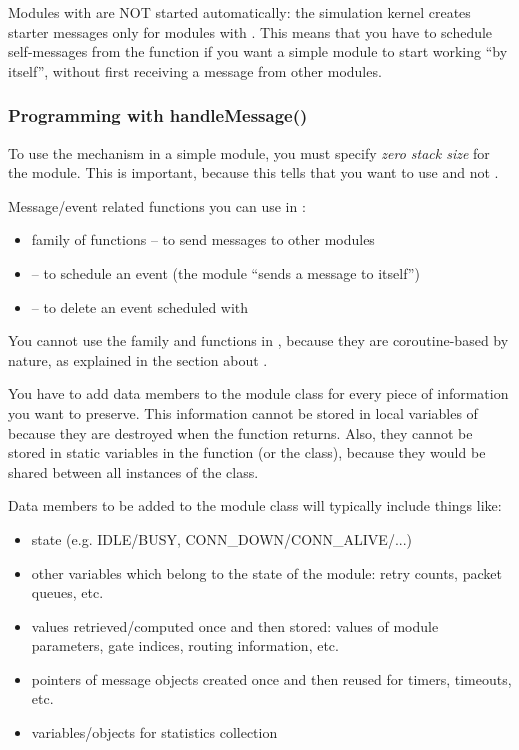 Modules with  are NOT started automatically:
the simulation kernel creates starter messages
only for modules with . This means that you have to
schedule self-messages from the
 function if you want a 
simple module to start working ``by itself'', without first receiving
a message from other modules.


\subsubsection{Programming with handleMessage()}


To use the  mechanism in a
simple module, you must specify \textit{zero
  stack size} for the module. This is
important, because this tells {\opp} that you want to use
 and not .

Message/event related functions you can use in :

\begin{itemize}
  \item{ family of functions -- to send messages to other modules}
  \item{ -- to schedule an event (the module ``sends a message to itself'')}
  \item{ -- to delete an event scheduled with }
\end{itemize}

You cannot use the  family and
 functions in , because they are
coroutine-based by nature, as explained in the section about
.

You have to add data members to the module class for every piece
of information you want to preserve. This information cannot
be stored in local variables of  because they
are destroyed when the function returns. Also, they cannot be
stored in static variables in the function (or the class), because
they would be shared between all instances of the class.


Data members to be added to the module class will typically include
things like:

\begin{itemize}
  \item{state (e.g. IDLE/BUSY, CONN\_DOWN/CONN\_ALIVE/...)}
  \item{other variables which belong to the state of the module: retry
    counts, packet queues, etc.}
  \item{values retrieved/computed once and then stored: values of module
    parameters, gate indices, routing information, etc.}
  \item{pointers of message objects created once and then reused for
    timers, timeouts, etc.}
  \item{variables/objects for statistics collection}
\end{itemize}

